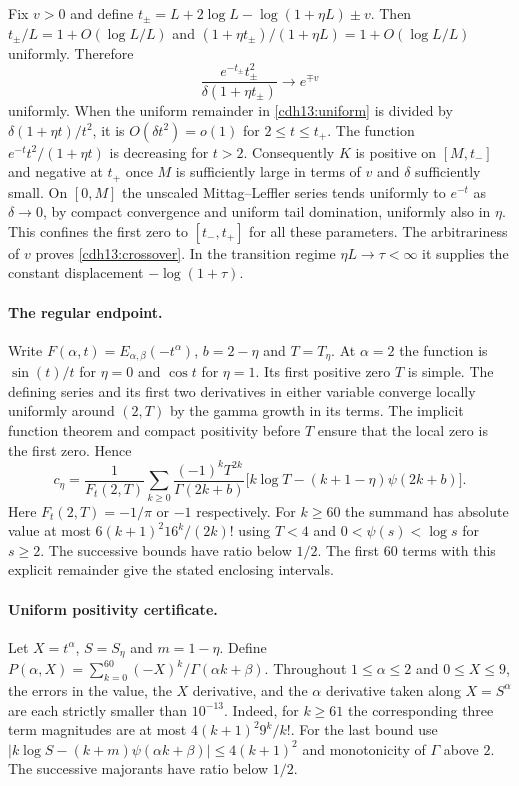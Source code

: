 \documentclass[11pt,a4paper]{article}
\numberwithin{equation}{section}
\begin{document}
Fix $v>0$ and define $t_\pm=L+2\log L-\log(1+\eta L)\pm v$.
Then $t_\pm/L=1+O(\log L/L)$ and
$(1+\eta t_\pm)/(1+\eta L)=1+O(\log L/L)$ uniformly. Therefore
\[
 \frac{e^{-t_\pm}t_\pm^2}{\delta(1+\eta t_\pm)}
       \longrightarrow e^{\mp v}
\]
uniformly. When the uniform remainder in \eqref{cdh13:uniform} is
divided by $\delta(1+\eta t)/t^2$, it is $O(\delta t^2)=o(1)$ for
$2\le t\le t_+$. The function $e^{-t}t^2/(1+\eta t)$ is decreasing
for $t>2$. Consequently $K$ is positive on $[M,t_-]$ and negative
at $t_+$ once $M$ is sufficiently large in terms of $v$ and $\delta$
sufficiently small. On $[0,M]$ the unscaled Mittag--Leffler series
tends uniformly to $e^{-t}$ as $\delta\to0$, by compact convergence
and uniform tail domination, uniformly also in $\eta$.
This confines the first zero to $[t_-,t_+]$ for all these parameters.
The arbitrariness of $v$ proves \eqref{cdh13:crossover}.
In the transition regime $\eta L\to\tau<\infty$ it supplies the
constant displacement $-\log(1+\tau)$.

\paragraph{The regular endpoint.}
Write $F(\alpha,t)=E_{\alpha,\beta}(-t^\alpha)$, $b=2-\eta$ and
$T=T_\eta$. At $\alpha=2$ the function is $\sin(t)/t$ for $\eta=0$
and $\cos t$ for $\eta=1$. Its first positive zero $T$ is simple.
The defining series and its first two derivatives in either variable
converge locally uniformly around $(2,T)$ by the gamma growth in
its terms. The implicit function theorem and compact positivity
before $T$ ensure that the local zero is the first zero. Hence
\[
 c_\eta=\frac{1}{F_t(2,T)}\sum_{k\ge0}
    \frac{(-1)^kT^{2k}}{\Gamma(2k+b)}
    \bigl[k\log T-(k+1-\eta)\psi(2k+b)\bigr].
\]
Here $F_t(2,T)=-1/\pi$ or $-1$ respectively. For $k\ge60$ the
summand has absolute value at most $6(k+1)^2 16^k/(2k)!$ using
$T<4$ and $0<\psi(s)<\log s$ for $s\ge2$.
The successive bounds have ratio below $1/2$. The first 60 terms
with this explicit remainder give the stated enclosing intervals.

\paragraph{Uniform positivity certificate.}
Let $X=t^\alpha$, $S=S_\eta$ and $m=1-\eta$. Define
$P(\alpha,X)=\sum_{k=0}^{60}(-X)^k/\Gamma(\alpha k+\beta)$.
Throughout $1\le\alpha\le2$ and $0\le X\le9$, the errors in the
value, the $X$ derivative, and the $\alpha$ derivative taken along
$X=S^\alpha$ are each strictly smaller than $10^{-13}$. Indeed,
for $k\ge61$ the corresponding three term magnitudes are at most
$4(k+1)^2 9^k/k!$. For the last bound use
$|k\log S-(k+m)\psi(\alpha k+\beta)|\le4(k+1)^2$ and monotonicity
of $\Gamma$ above $2$. The successive majorants have ratio below $1/2$.
\end{document}
